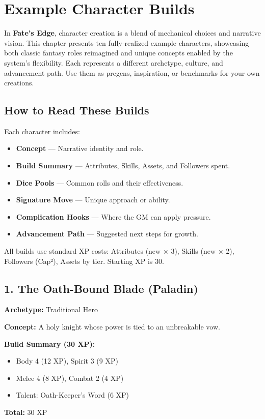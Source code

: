 
\chapter{Example Character Builds}
\label{ch:example-builds}

In \textbf{Fate's Edge}, character creation is a blend of mechanical choices and narrative vision. This chapter presents ten fully-realized example characters, showcasing both classic fantasy roles reimagined and unique concepts enabled by the system's flexibility. Each represents a different archetype, culture, and advancement path. Use them as pregens, inspiration, or benchmarks for your own creations.

\section{How to Read These Builds}

Each character includes:
\begin{itemize}
  \item \textbf{Concept} — Narrative identity and role.
  \item \textbf{Build Summary} — Attributes, Skills, Assets, and Followers spent.
  \item \textbf{Dice Pools} — Common rolls and their effectiveness.
  \item \textbf{Signature Move} — Unique approach or ability.
  \item \textbf{Complication Hooks} — Where the GM can apply pressure.
  \item \textbf{Advancement Path} — Suggested next steps for growth.
\end{itemize}

All builds use standard XP costs: Attributes (new × 3), Skills (new × 2), Followers (Cap²), Assets by tier. Starting XP is 30.

\section{1. The Oath-Bound Blade (Paladin)}
\textbf{Archetype:} Traditional Hero

\textbf{Concept:} A holy knight whose power is tied to an unbreakable vow.

\textbf{Build Summary (30 XP):}
\begin{itemize}
  \item Body 4 (12 XP), Spirit 3 (9 XP)
  \item Melee 4 (8 XP), Combat 2 (4 XP)
  \item Talent: Oath-Keeper's Word (6 XP)
\end{itemize}
\textbf{Total:} 30 XP


